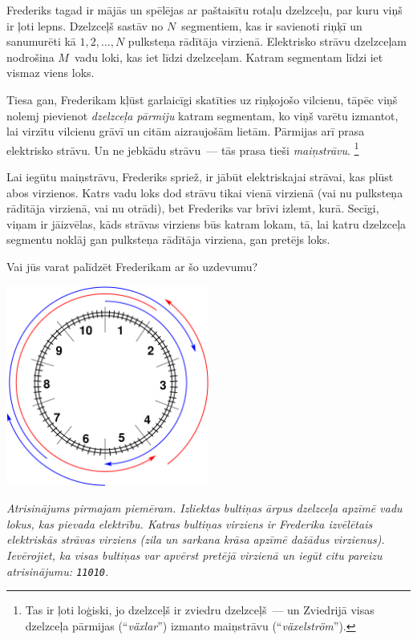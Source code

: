 \ifx\boi\undefined\fi
\def\version{jury-1}
Frederiks tagad ir mājās un spēlējas ar paštaisītu rotaļu dzelzceļu, par kuru viņš ir ļoti lepns.
Dzelzceļš sastāv no $N$~segmentiem, kas ir savienoti riņķī un sanumurēti kā $1, 2, \dots, N$ pulksteņa rādītāja virzienā.
Elektrisko strāvu dzelzceļam nodrošina $M$~vadu loki, kas iet līdzi dzelzceļam.
Katram segmentam līdzi iet vismaz viens loks.

Tiesa gan, Frederikam kļūst garlaicīgi skatīties uz riņķojošo vilcienu, tāpēc viņš nolemj pievienot \emph{dzelzceļa pārmiju}
katram segmentam, ko viņš varētu izmantot, lai virzītu vilcienu grāvī un citām aizraujošām lietām.
Pārmijas arī prasa elektrisko strāvu. Un ne jebkādu strāvu~--- tās prasa tieši \emph{maiņstrāvu}.%
\footnote{Tas ir ļoti loģiski, jo dzelzceļš ir zviedru dzelzceļš~--- un Zviedrijā visas dzelzceļa pārmijas
(``\emph{växlar}'') izmanto maiņstrāvu (``\emph{växelström}'').}

Lai iegūtu maiņstrāvu, Frederiks spriež, ir jābūt elektriskajai strāvai, kas plūst abos
virzienos. Katrs vadu loks dod strāvu tikai vienā virzienā (vai nu pulksteņa rādītāja virzienā,
vai nu otrādi), bet Frederiks var brīvi izlemt, kurā. Secīgi, viņam ir jāizvēlas,
kāds strāvas virziens būs katram lokam, tā, lai katru dzelzceļa segmentu noklāj gan pulksteņa
rādītāja virziena, gan pretējs loks.

Vai jūs varat palīdzēt Frederikam ar šo uzdevumu?

\vspace{2mm}
\begin{center}
\includegraphics[width=0.5\textwidth]{alternatingfig.pdf}
\end{center}
\vspace{1mm}
{\em Atrisinājums pirmajam piemēram. Izliektas bultiņas ārpus dzelzceļa apzīmē vadu lokus, kas pievada elektrību. Katras bultiņas virziens ir Frederika izvēlētais elektriskās strāvas virziens (zila un sarkana krāsa apzīmē dažādus virzienus). Ievērojiet, ka visas bultiņas var apvērst pretējā virzienā un iegūt citu pareizu atrisinājumu: \texttt{11010}.}

